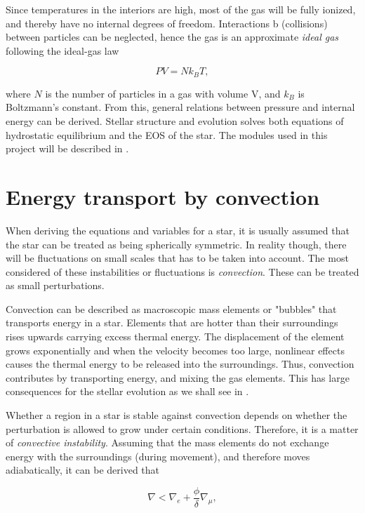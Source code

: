 Since temperatures in the interiors are high, most of the gas will be fully ionized, and thereby have no internal degrees of freedom. Interactions b (collisions) between particles can be neglected, hence the gas is an approximate \textit{ideal gas} following the ideal-gas law

\begin{equation}
    PV = N k_B T,
\end{equation}

\noindent where $N$ is the number of particles in a gas with volume V, and $k_B$ is Boltzmann's constant. From this, general relations between pressure and internal energy can be derived. Stellar structure and evolution solves both equations of hydrostatic equilibrium and the EOS of the star. The modules used in this project will be described in . 


\section{Energy transport by convection}
\label{sec:energybyconvection}
When deriving the equations and variables for a star, it is usually assumed that the star can be treated as being spherically symmetric. In reality though, there will be fluctuations on small scales that has to be taken into account. The most considered of these instabilities or fluctuations is \textit{convection}. These can be treated as small perturbations. 

Convection can be described as macroscopic mass elements or "bubbles" that transports energy in a star. Elements that are hotter than their surroundings rises upwards carrying excess thermal energy. The displacement of the element grows exponentially and when the velocity becomes too large, nonlinear effects causes the thermal energy to be released into the surroundings. Thus, convection contributes by transporting energy, and mixing the gas elements. This has large consequences for the stellar evolution as we shall see in . 

Whether a region in a star is stable against convection depends on whether the perturbation is allowed to grow under certain conditions. Therefore, it is a matter of \textit{convective instability}. Assuming that the mass elements do not exchange energy with the surroundings (during movement), and therefore moves adiabatically, it can be derived that 

\begin{equation}
\label{instability_eq}
    \nabla < \nabla_e + \frac{\phi}{\delta}\nabla_{\mu},
\end{equation}

